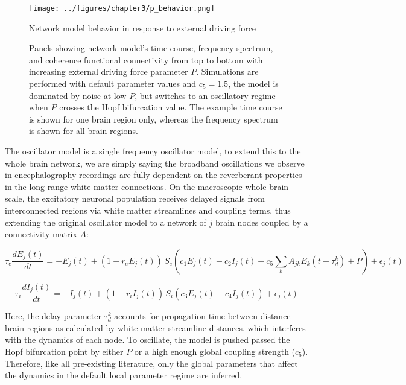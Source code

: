 \begin{figure}[htbp]
    \centering
    \texttt{[image: ../figures/chapter3/p\_behavior.png]}
    \caption{Network model behavior in response to external driving force}
    \caption*{Panels showing network model's time course, frequency spectrum, and coherence functional connectivity from top to bottom with increasing external driving force parameter $P$. Simulations are performed with default parameter values and $c_5 = 1.5$, the model is dominated by noise at low $P$, but switches to an oscillatory regime when $P$ crosses the Hopf bifurcation value. The example time course is shown for one brain region only, whereas the frequency spectrum is shown for all brain regions.}
    \label{fig:p_behavior}
\end{figure}

The oscillator model is a single frequency oscillator model, to extend this to the whole brain network, we are simply saying the broadband oscillations we observe in encephalography recordings are fully dependent on the reverberant properties in the long range white matter connections. On the macroscopic whole brain scale, the excitatory neuronal population receives delayed signals from interconnected regions via white matter streamlines and coupling terms, thus extending the original oscillator model to a network of $j$ brain nodes coupled by a connectivity matrix $A$:

\begin{equation}
    \label{eq:wcn_ex}
\tau_e \frac{dE_{j}(t)}{dt} = -E_{j}(t) + (1 - r_e E_{j}(t)) \, S_e(c_1 E_{j}(t) - c_2 I_{j}(t) + c_5 \sum_{k} A_{jk} E_{k}(t - \tau_d^k) + P) + \epsilon_{j} (t)
\end{equation}

\begin{equation}
\label{eq:wcn_in}
\tau_i \frac{dI_{j}(t)}{dt} = -I_{j}(t) + (1 - r_i I_{j}(t)) \, S_i(c_3 E_{j}(t) - c_4 I_{j}(t)) + \epsilon_{j} (t)
\end{equation}

Here, the delay parameter $\tau_d^k$ accounts for propagation time between distance brain regions as calculated by white matter streamline distances, which interferes with the dynamics of each node. To oscillate, the model is pushed passed the Hopf bifurcation point by either $P$ or a high enough global coupling strength  ($c_5$). Therefore,  like all pre-existing literature, only the global parameters that affect the dynamics in the default local parameter regime are inferred. 

